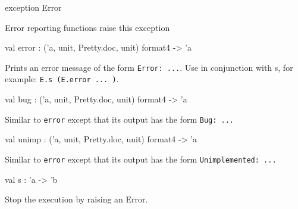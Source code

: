 \documentclass[11pt]{article}
\begin{document}
\label{exception:Errormsg.Error}\begin{ocamldoccode}
exception Error
\end{ocamldoccode}
\begin{ocamldocdescription}
Error reporting functions raise this exception


\end{ocamldocdescription}




\label{val:Errormsg.error}\begin{ocamldoccode}
val error : ('a, unit, Pretty.doc, unit) format4 -> 'a
\end{ocamldoccode}
\begin{ocamldocdescription}
Prints an error message of the form {\tt{Error: ...}}. 
    Use in conjunction with s, for example: {\tt{E.s (E.error ... )}}.


\end{ocamldocdescription}




\label{val:Errormsg.bug}\begin{ocamldoccode}
val bug : ('a, unit, Pretty.doc, unit) format4 -> 'a
\end{ocamldoccode}
\begin{ocamldocdescription}
Similar to {\tt{error}} except that its output has the form {\tt{Bug: ...}}


\end{ocamldocdescription}




\label{val:Errormsg.unimp}\begin{ocamldoccode}
val unimp : ('a, unit, Pretty.doc, unit) format4 -> 'a
\end{ocamldoccode}
\begin{ocamldocdescription}
Similar to {\tt{error}} except that its output has the form {\tt{Unimplemented: ...}}


\end{ocamldocdescription}




\label{val:Errormsg.s}\begin{ocamldoccode}
val s : 'a -> 'b
\end{ocamldoccode}
\begin{ocamldocdescription}
Stop the execution by raising an Error.


\end{ocamldocdescription}
\end{document}
